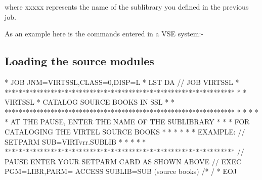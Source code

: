 \documentclass[letterpaper,10pt,english]{sphinxmanual}
\begin{document}
where xxxxx represents the name of the sublibrary you defined in the previous job.

As an example here is the commands entered in a VSE system:-

\begin{sphinxVerbatim}[commandchars=\\\{\}]
            
               
                                                            
                                                                    
    
   
    
       
\end{sphinxVerbatim}


\subsection{Loading the source modules}
\label{\detokenize{Installation_Guide:loading-the-source-modules}}
\begin{sphinxVerbatim}[commandchars=\\\{\}]
* \PYGZdl{}\PYGZdl{} JOB JNM=VIRTSSL,CLASS=0,DISP=L
* \PYGZdl{}\PYGZdl{} LST DA
// JOB VIRTSSL
* *****************************************************************
* * VIRTSSL * CATALOG SOURCE BOOKS IN SSL                         *
* *****************************************************************
* *                                                               *
* * AT THE PAUSE, ENTER THE NAME OF THE SUB\PYGZhy{}LIBRARY               *
* * FOR CATALOGING THE VIRTEL SOURCE BOOKS                        *
* *                                                               *
* * EXAMPLE: // SETPARM SUB=\PYGZsq{}VIRTvrr.SUBLIB\PYGZsq{}                      *
* *                                                               *
* *****************************************************************
// PAUSE ENTER YOUR SETPARM CARD AS SHOWN ABOVE
// EXEC PGM=LIBR,PARM=\PYGZsq{} ACCESS SUBLIB=\PYGZam{}SUB\PYGZsq{}
        (source books)
/*
/\PYGZam{}
* \PYGZdl{}\PYGZdl{} EOJ
\end{sphinxVerbatim}
\end{document}
